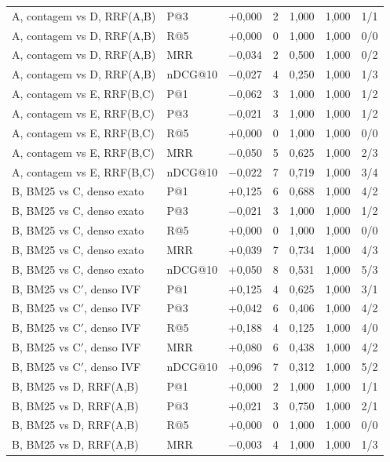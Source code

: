 {\begin{longtable}{llccccl}
A, contagem vs D, RRF(A,B) & P@3 & +0{,}000 & 2 & 1{,}000 & 1{,}000 & 1/1 \\
A, contagem vs D, RRF(A,B) & R@5 & +0{,}000 & 0 & 1{,}000 & 1{,}000 & 0/0 \\
A, contagem vs D, RRF(A,B) & MRR & $-$0{,}034 & 2 & 0{,}500 & 1{,}000 & 0/2 \\
A, contagem vs D, RRF(A,B) & nDCG@10 & $-$0{,}027 & 4 & 0{,}250 & 1{,}000 & 1/3 \\
A, contagem vs E, RRF(B,C) & P@1 & $-$0{,}062 & 3 & 1{,}000 & 1{,}000 & 1/2 \\
A, contagem vs E, RRF(B,C) & P@3 & $-$0{,}021 & 3 & 1{,}000 & 1{,}000 & 1/2 \\
A, contagem vs E, RRF(B,C) & R@5 & +0{,}000 & 0 & 1{,}000 & 1{,}000 & 0/0 \\
A, contagem vs E, RRF(B,C) & MRR & $-$0{,}050 & 5 & 0{,}625 & 1{,}000 & 2/3 \\
A, contagem vs E, RRF(B,C) & nDCG@10 & $-$0{,}022 & 7 & 0{,}719 & 1{,}000 & 3/4 \\
B, BM25 vs C, denso exato & P@1 & +0{,}125 & 6 & 0{,}688 & 1{,}000 & 4/2 \\
B, BM25 vs C, denso exato & P@3 & $-$0{,}021 & 3 & 1{,}000 & 1{,}000 & 1/2 \\
B, BM25 vs C, denso exato & R@5 & +0{,}000 & 0 & 1{,}000 & 1{,}000 & 0/0 \\
B, BM25 vs C, denso exato & MRR & +0{,}039 & 7 & 0{,}734 & 1{,}000 & 4/3 \\
B, BM25 vs C, denso exato & nDCG@10 & +0{,}050 & 8 & 0{,}531 & 1{,}000 & 5/3 \\
B, BM25 vs C$'$, denso IVF & P@1 & +0{,}125 & 4 & 0{,}625 & 1{,}000 & 3/1 \\
B, BM25 vs C$'$, denso IVF & P@3 & +0{,}042 & 6 & 0{,}406 & 1{,}000 & 4/2 \\
B, BM25 vs C$'$, denso IVF & R@5 & +0{,}188 & 4 & 0{,}125 & 1{,}000 & 4/0 \\
B, BM25 vs C$'$, denso IVF & MRR & +0{,}080 & 6 & 0{,}438 & 1{,}000 & 4/2 \\
B, BM25 vs C$'$, denso IVF & nDCG@10 & +0{,}096 & 7 & 0{,}312 & 1{,}000 & 5/2 \\
B, BM25 vs D, RRF(A,B) & P@1 & +0{,}000 & 2 & 1{,}000 & 1{,}000 & 1/1 \\
B, BM25 vs D, RRF(A,B) & P@3 & +0{,}021 & 3 & 0{,}750 & 1{,}000 & 2/1 \\
B, BM25 vs D, RRF(A,B) & R@5 & +0{,}000 & 0 & 1{,}000 & 1{,}000 & 0/0 \\
B, BM25 vs D, RRF(A,B) & MRR & $-$0{,}003 & 4 & 1{,}000 & 1{,}000 & 1/3 \\

\end{longtable}}
